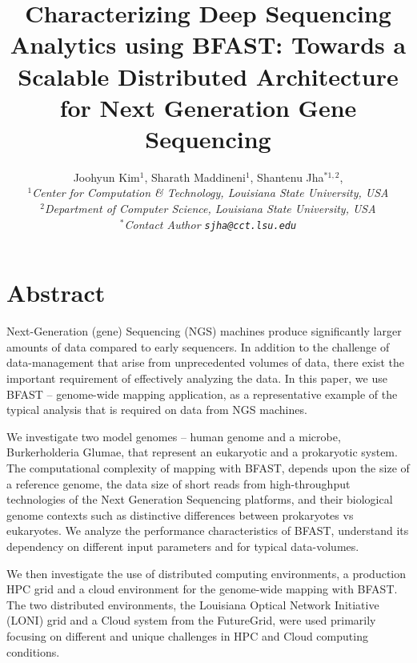 \documentclass[12pt]{article}
\begin{document}
\title{Characterizing Deep Sequencing Analytics using BFAST: Towards a
  Scalable Distributed Architecture for Next Generation Gene
  Sequencing}

\author{Joohyun Kim$^{1}$, Sharath Maddineni$^{1}$, Shantenu Jha$^{*1,2}$, \\
  \small{\emph{$^{1}$Center for Computation \& Technology, Louisiana State University, USA}}\\
  \small{\emph{$^{2}$Department of Computer Science, Louisiana State University, USA}}\\
  \small{\emph{$^{*}$Contact Author \texttt{sjha@cct.lsu.edu}}}
  }


\maketitle

\section*{Abstract}

Next-Generation (gene) Sequencing (NGS) machines produce significantly larger amounts of data compared to early sequencers.  In addition to the challenge of data-management that arise from unprecedented volumes of data, there exist the important requirement of effectively analyzing the data.  In this paper, we use BFAST -- genome-wide mapping application, as a representative example of the typical analysis that is required on data from NGS machines.  

We investigate two model genomes -- human genome and a microbe, Burkerholderia Glumae, that represent an eukaryotic and a prokaryotic system.  The computational complexity %
of mapping with BFAST, depends upon the size of a reference genome, the data size of short reads from high-throughput technologies of the Next Generation Sequencing platforms, and their biological genome contexts such as distinctive differences between prokaryotes vs eukaryotes.
We analyze the performance characteristics of BFAST, understand its dependency on different input parameters and for typical data-volumes. 

We then investigate the use of distributed computing environments, a production HPC grid and a cloud environment for the genome-wide mapping with BFAST.  The two distributed environments, the Louisiana Optical Network Initiative (LONI) grid and a Cloud system from the FutureGrid, were used primarily focusing on different and unique challenges in HPC and Cloud computing conditions.
\end{document}
